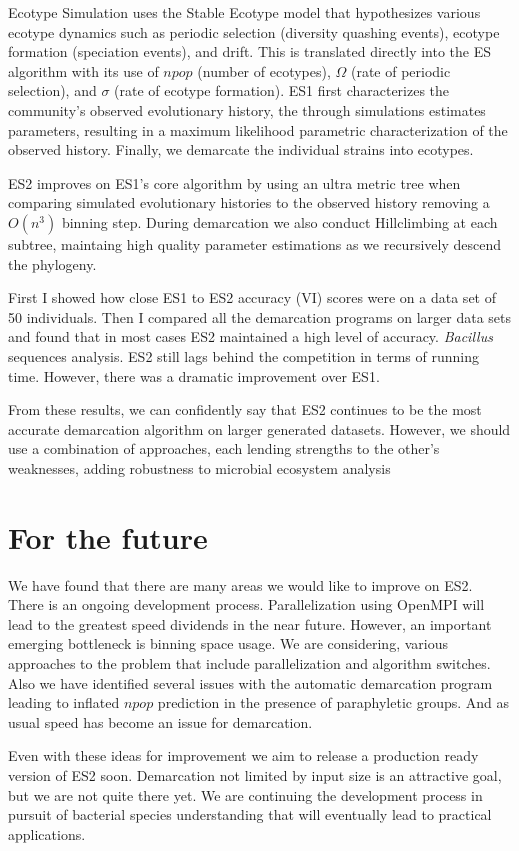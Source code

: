 Ecotype Simulation uses the Stable Ecotype model that hypothesizes various ecotype dynamics such as periodic selection (diversity quashing events), ecotype formation (speciation events), and drift.
This is translated directly into the ES algorithm with its use of $npop$ (number of ecotypes), $\Omega$ (rate of periodic selection), and $\sigma$ (rate of ecotype formation).
ES1 first characterizes the community's observed evolutionary history, the through simulations estimates parameters, resulting in a maximum likelihood parametric characterization of the observed history.
Finally, we demarcate the individual strains into ecotypes.

ES2 improves on ES1's core algorithm by using an ultra metric tree when comparing simulated evolutionary histories to the observed history removing a $O(n^3)$ binning step.
During demarcation we also conduct Hillclimbing at each subtree, maintaing high quality parameter estimations as we recursively descend the phylogeny.

First I showed how close ES1 to ES2 accuracy (VI) scores were on a data set of 50 individuals.
Then I compared all the demarcation programs on larger data sets and found that in most cases ES2 maintained a high level of accuracy.
\emph{Bacillus} sequences analysis.
ES2 still lags behind the competition in terms of running time.
However, there was a dramatic improvement over ES1.

From these results, we can confidently say that ES2 continues to be the most accurate demarcation algorithm on larger generated datasets. However, we should use a combination of approaches, each lending strengths to the other's weaknesses, adding robustness to microbial ecosystem analysis~\cite{bohannan2003new}

\section{For the future}
We have found that there are many areas we would like to improve on ES2.
There is an ongoing development process.
Parallelization using OpenMPI will lead to the greatest speed dividends in the near future.
However, an important emerging bottleneck is binning space usage.
We are considering, various approaches to the problem that include parallelization and algorithm switches.
Also we have identified several issues with the automatic demarcation program leading to inflated $npop$ prediction in the presence of paraphyletic groups.
And as usual speed has become an issue for demarcation.

Even with these ideas for improvement we aim to release a production ready version of ES2 soon.
Demarcation not limited by input size is an attractive goal, but we are not quite there yet.
We are continuing the development process in pursuit of bacterial species understanding that will eventually lead to practical applications.

